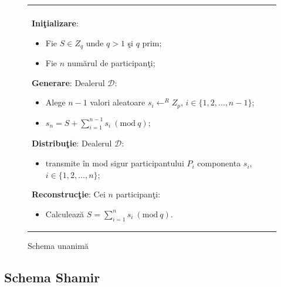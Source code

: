 \documentclass{llncs}
\newcommand{\Mod}[1]{\ (\text{mod}\ #1)}
\begin{document}
\begin{figure}[h!]

\begin{tabular}{|p{\textwidth}|}
\hline

\\
\hspace{.1in}
\textbf{Ini\c{t}ializare}: 
	\begin{itemize}
		\item Fie $S \in Z_q$ unde $q > 1 $ \c{s}i $q$ prim;
		\item Fie $n$ num\u{a}rul de participan\c{t}i;
	\end{itemize}
\medskip

\hspace{.1in}
\textbf{Generare}: Dealerul $\mathcal{D}$:
	\begin{itemize}
		\setlength{\itemsep}{5pt}
		\item Alege $n - 1$ valori aleatoare $s_i \leftarrow^R Z_p$, $i \in \{1,2,\dots,{n-1}\}$;
		\item $s_n = S + \sum\limits_{i=1}^{n-1} s_i \Mod q $;
	\end{itemize}
\medskip

\hspace{.1in}
\textbf{Distribu\c{t}ie}: Dealerul $\mathcal{D}$:
	\begin{itemize}
		\item transmite \^{i}n mod sigur participantului $P_i$ componenta $s_i$, $i \in \{1,2,\dots,n\}$;
	\end{itemize}

\hspace{.1in}
\textbf{Reconstruc\c{t}ie}: Cei $n$ participan\c{t}i:
	\begin{itemize}
		\item Calculeaz\u{a} $S = \sum\limits_{i=1}^{n} s_i \Mod q$.
	\end{itemize}

\\
\hline
\end{tabular}
\caption{Schema unanim\u{a} \cite{Karnin:83}}
\label{fig:all_or_nothing}
\end{figure}




\subsection{Schema Shamir}
\end{document}
